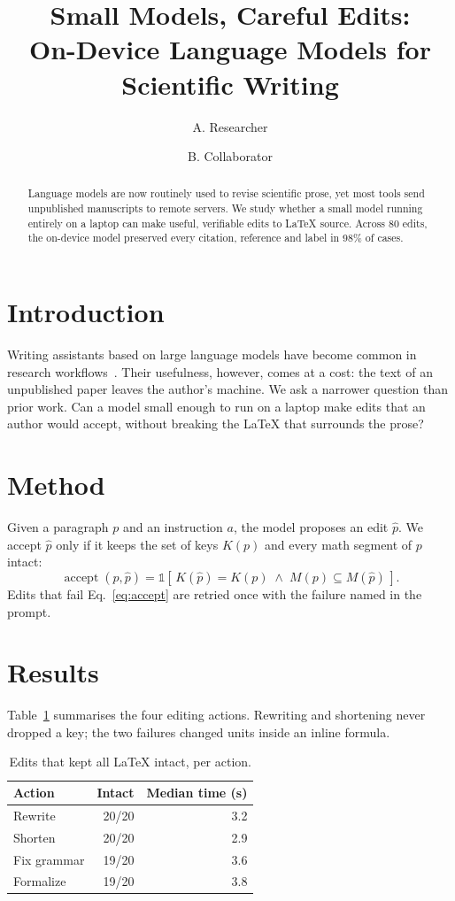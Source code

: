 \documentclass[11pt]{article}
\title{Small Models, Careful Edits:\\ On-Device Language Models for Scientific Writing}
\author{A. Researcher \and B. Collaborator}
\date{}
\begin{document}
\maketitle

\begin{abstract}
Language models are now routinely used to revise scientific prose, yet most tools send unpublished
manuscripts to remote servers. We study whether a small model running entirely on a laptop can make
useful, verifiable edits to \LaTeX{} source. Across 80 edits, the on-device model preserved every
citation, reference and label in 98\% of cases.
\end{abstract}

\section{Introduction}
\label{sec:intro}
Writing assistants based on large language models have become common in research
workflows~\citep{smith2024assist}. Their usefulness, however, comes at a cost: the text of an
unpublished paper leaves the author's machine. We ask a narrower question than prior work. Can a
model small enough to run on a laptop make edits that an author would accept, without breaking
the \LaTeX{} that surrounds the prose?

\section{Method}
\label{sec:method}
Given a paragraph $p$ and an instruction $a$, the model proposes an edit $\hat{p}$. We accept
$\hat{p}$ only if it keeps the set of keys $K(p)$ and every math segment of $p$ intact:
\begin{equation}
  \operatorname{accept}(p, \hat{p}) =
  \mathbb{1}\left[\, K(\hat{p}) = K(p) \;\wedge\; M(p) \subseteq M(\hat{p}) \,\right].
  \label{eq:accept}
\end{equation}
Edits that fail Eq.~\eqref{eq:accept} are retried once with the failure named in the prompt.

\section{Results}
\label{sec:results}
Table~\ref{tab:results} summarises the four editing actions. Rewriting and shortening never
dropped a key; the two failures changed units inside an inline formula.

\begin{table}[h]
  \centering
  \begin{tabular}{lrr}
    \hline
    Action & Intact & Median time (s) \\
    \hline
    Rewrite & 20/20 & 3.2 \\
    Shorten & 20/20 & 2.9 \\
    Fix grammar & 19/20 & 3.6 \\
    Formalize & 19/20 & 3.8 \\
    \hline
  \end{tabular}
  \caption{Edits that kept all \LaTeX{} intact, per action.}
  \label{tab:results}
\end{table}



\end{document}
